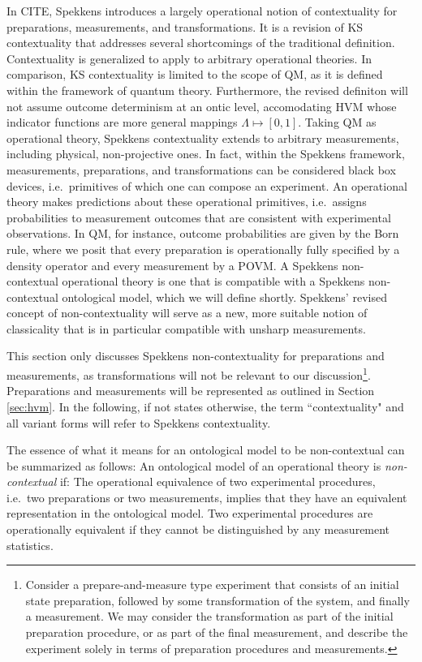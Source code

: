 In CITE, Spekkens introduces a largely operational notion of contextuality for preparations, measurements, and transformations. It is a revision of KS contextuality that addresses several shortcomings of the traditional definition. Contextuality is generalized to apply to arbitrary operational theories. In comparison, KS contextuality is limited to the scope of QM, as it is defined within the framework of quantum theory. Furthermore, the revised definiton will not assume outcome determinism at an ontic level, accomodating HVM whose indicator functions are more general mappings $\Lambda\mapsto [0,1]$. Taking QM as operational theory, Spekkens contextuality extends to arbitrary measurements, including physical, non-projective ones. In fact, within the Spekkens framework, measurements, preparations, and transformations can be considered black box devices, i.e.\ primitives of which one can compose an experiment. An operational theory makes predictions about these operational primitives, i.e.\ assigns probabilities to measurement outcomes that are consistent with experimental observations. In QM, for instance, outcome probabilities are given by the Born rule, where we posit that every preparation is operationally fully specified by a density operator and every measurement by a POVM. A Spekkens non-contextual operational theory is one that is compatible with a Spekkens non-contextual ontological model, which we will define shortly. Spekkens' revised concept of non-contextuality will serve as a new, more suitable notion of classicality that is in particular compatible with unsharp measurements.

This section only discusses Spekkens non-contextuality for preparations and measurements, as transformations will not be relevant to our discussion\footnote{Consider a prepare-and-measure type experiment that consists of an initial state preparation, followed by some transformation of the system, and finally a measurement. We may consider the transformation as part of the initial preparation procedure, or as part of the final measurement, and describe the experiment solely in terms of preparation procedures and measurements.}. Preparations and measurements will be represented as outlined in Section \ref{sec:hvm}. In the following, if not states otherwise, the term ``contextuality" and all variant forms will refer to Spekkens contextuality.

The essence of what it means for an ontological model to be non-contextual can be summarized as follows:
An ontological model of an operational theory is \emph{non-contextual} if:
The operational equivalence of two experimental procedures, i.e.\ two preparations or two measurements, 
implies that they have an equivalent representation in the ontological model.
Two experimental procedures are operationally equivalent if they cannot be distinguished by any measurement statistics. 

